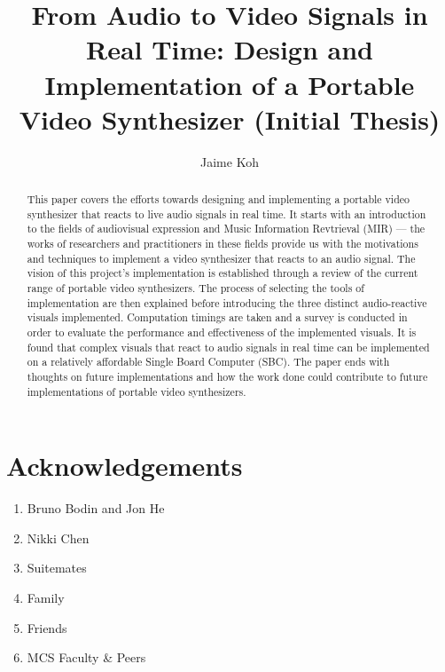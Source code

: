 \documentclass{report}
\title{From Audio to Video Signals in Real Time: Design and Implementation of a Portable Video Synthesizer (Initial Thesis)}
\author{Jaime Koh}
\begin{document}


\chapter*{Acknowledgements}
\markright{}

\begin{enumerate}
\item Bruno Bodin and Jon He
\item Nikki Chen
\item Suitemates
\item Family
\item Friends
\item MCS Faculty \& Peers
\end{enumerate}

\begin{abstract}
This paper covers the efforts towards designing and implementing a portable video synthesizer that reacts to live audio signals in real time. It starts with an introduction to the fields of audiovisual expression and Music Information Revtrieval (MIR) --- the works of researchers and practitioners in these fields provide us with the motivations and techniques to implement a video synthesizer that reacts to an audio signal. The vision of this project's implementation is established through a review of the current range of portable video synthesizers. The process of selecting the tools of implementation are then explained before introducing the three distinct audio-reactive visuals implemented. Computation timings are taken and a survey is conducted in order to evaluate the performance and effectiveness of the implemented visuals. It is found that complex visuals that react to audio signals in real time can be implemented on a relatively affordable Single Board Computer (SBC). The paper ends with thoughts on future implementations and how the work done could contribute to future implementations of portable video synthesizers.
\end{abstract}

\newpage
\tableofcontents
\newpage
\end{document}
